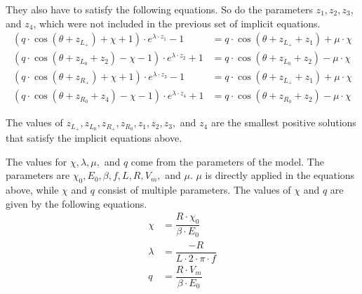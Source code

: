 They also have to satisfy the following equations.
So do the parameters $z_1, z_2, z_3$, and $z_4$, which were not included in the previous set of implicit equations.
\begin{subequations}
	\begin{align}
		(q \cdot \cos(\theta + z_{L_+}) + \chi + 1) \cdot e^{\lambda \cdot z_1} - 1
		 & = q \cdot  \cos(\theta + z_{L_+} + z_1) + \mu \cdot \chi \\
		(q \cdot \cos(\theta + z_{L_0} + z_2) - \chi - 1) \cdot e^{\lambda \cdot z_2} + 1
		 & = q \cdot  \cos(\theta + z_{L_0} + z_2) - \mu \cdot \chi \\
		(q \cdot \cos(\theta + z_{R_+}) + \chi + 1) \cdot e^{\lambda \cdot z_3} - 1
		 & = q \cdot  \cos(\theta + z_{L_+} + z_1) + \mu \cdot \chi \\
		(q \cdot \cos(\theta + z_{R_0} + z_4) - \chi - 1) \cdot e^{\lambda \cdot z_4} + 1
		 & = q \cdot  \cos(\theta + z_{R_0} + z_2) - \mu \cdot \chi
	\end{align}
\end{subequations}

The values of $z_{L_+}, z_{L_0}, z_{R_+}, z_{R_0}, z_1, z_2, z_3,$ and $z_4$ are the smallest positive solutions that satisfy the implicit equations above.


The values for $\chi, \lambda, \mu,$ and $q$ come from the parameters of the model.
The parameters are $\chi_0, E_0, \beta, f, L, R, V_m,$ and $\mu$.
$\mu$ is directly applied in the equations above, while $\chi$ and $q$ consist of multiple parameters.
The values of $\chi$ and $q$ are given by the following equations.
\begin{subequations}
	\begin{align}
		\chi    & = \dfrac{R \cdot \chi_0}{\beta \cdot E_0} \\
		\lambda & = \dfrac{-R}{L \cdot 2 \cdot \pi \cdot f} \\
		q       & = \dfrac{R \cdot V_m}{\beta \cdot E_0}
	\end{align}
\end{subequations}
